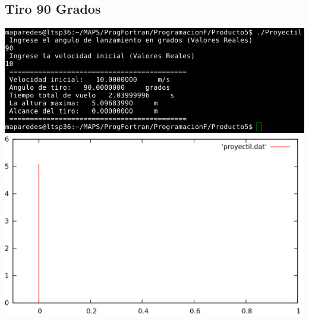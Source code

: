 \documentclass[12pt]{article}
\begin{document}
\subsection{Tiro 90 Grados}
\begin{center}
\includegraphics[width=15cm]{T90.png}
\includegraphics[width=15cm]{Parabolico90.png}
\end{center}
\end{document}
